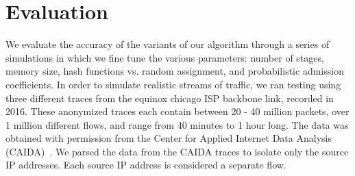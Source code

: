 \section{Evaluation}
\label{sec:eval}
We evaluate the accuracy of the variants of our algorithm through a series of simulations in which we fine tune the various parameters: number of stages, memory size, hash functions vs. random assignment, and probabilistic admission coefficients. In order to simulate realistic streams of traffic, we ran testing using three different traces from the equinox chicago ISP backbone link, recorded in 2016. These anonymized traces each contain between 20 - 40 million packets, over 1 million different flows, and range from 40 minutes to 1 hour long. The data was obtained with permission from the Center for Applied Internet Data Analysis (CAIDA)~\cite{caida}. We parsed the data from the CAIDA traces to isolate only the source IP addresses. Each source IP address is considered a separate flow.
